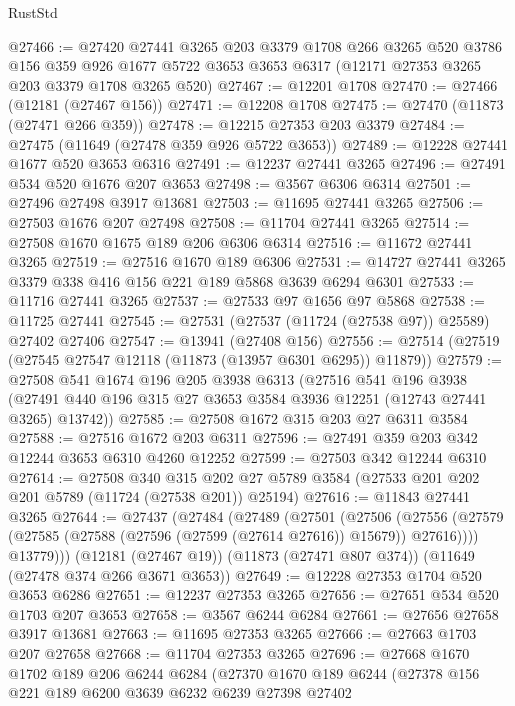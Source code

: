 \begin{lexlean}{RustStd}
\begin{coremodule}
@27466 := @27420
    @27441
    @3265
    @203
    @3379
    @1708
    @266
    @3265
    @520
    @3786
    @156
    @359
    @926
    @1677
    @5722
    @3653
    @3653
    @6317
    (@12171 @27353 @3265 @203 @3379 @1708 @3265 @520)
@27467 := @12201 @1708
@27470 := @27466 (@12181 (@27467 @156))
@27471 := @12208 @1708
@27475 := @27470 (@11873 (@27471 @266 @359))
@27478 := @12215 @27353 @203 @3379
@27484 := @27475 (@11649 (@27478 @359 @926 @5722 @3653))
@27489 := @12228 @27441 @1677 @520 @3653 @6316
@27491 := @12237 @27441 @3265
@27496 := @27491 @534 @520 @1676 @207 @3653
@27498 := @3567 @6306 @6314
@27501 := @27496 @27498 @3917 @13681
@27503 := @11695 @27441 @3265
@27506 := @27503 @1676 @207 @27498
@27508 := @11704 @27441 @3265
@27514 := @27508 @1670 @1675 @189 @206 @6306 @6314
@27516 := @11672 @27441 @3265
@27519 := @27516 @1670 @189 @6306
@27531 := @14727 @27441 @3265 @3379 @338 @416 @156 @221 @189 @5868 @3639 @6294 @6301
@27533 := @11716 @27441 @3265
@27537 := @27533 @97 @1656 @97 @5868
@27538 := @11725 @27441
@27545 := @27531 (@27537 (@11724 (@27538 @97)) @25589) @27402 @27406
@27547 := @13941 (@27408 @156)
@27556 := @27514 (@27519 (@27545 @27547 @12118 (@11873 (@13957 @6301 @6295)) @11879))
@27579 := @27508
    @541
    @1674
    @196
    @205
    @3938
    @6313
    (@27516
      @541
      @196
      @3938
      (@27491 @440 @196 @315 @27 @3653 @3584 @3936 @12251 (@12743 @27441 @3265) @13742))
@27585 := @27508 @1672 @315 @203 @27 @6311 @3584
@27588 := @27516 @1672 @203 @6311
@27596 := @27491 @359 @203 @342 @12244 @3653 @6310 @4260 @12252
@27599 := @27503 @342 @12244 @6310
@27614 := @27508
    @340
    @315
    @202
    @27
    @5789
    @3584
    (@27533 @201 @202 @201 @5789 (@11724 (@27538 @201)) @25194)
@27616 := @11843 @27441 @3265
@27644 := @27437
    (@27484
      (@27489
        (@27501
          (@27506
            (@27556 (@27579 (@27585 (@27588 (@27596 (@27599 (@27614 @27616)) @15679)) @27616))))
          @13779)))
    (@12181 (@27467 @19))
    (@11873 (@27471 @807 @374))
    (@11649 (@27478 @374 @266 @3671 @3653))
@27649 := @12228 @27353 @1704 @520 @3653 @6286
@27651 := @12237 @27353 @3265
@27656 := @27651 @534 @520 @1703 @207 @3653
@27658 := @3567 @6244 @6284
@27661 := @27656 @27658 @3917 @13681
@27663 := @11695 @27353 @3265
@27666 := @27663 @1703 @207 @27658
@27668 := @11704 @27353 @3265
@27696 := @27668
    @1670
    @1702
    @189
    @206
    @6244
    @6284
    (@27370
      @1670
      @189
      @6244
      (@27378
        @156
        @221
        @189
        @6200
        @3639
        @6232
        @6239
        @27398
        @27402

\end{coremodule}
\end{lexlean}
